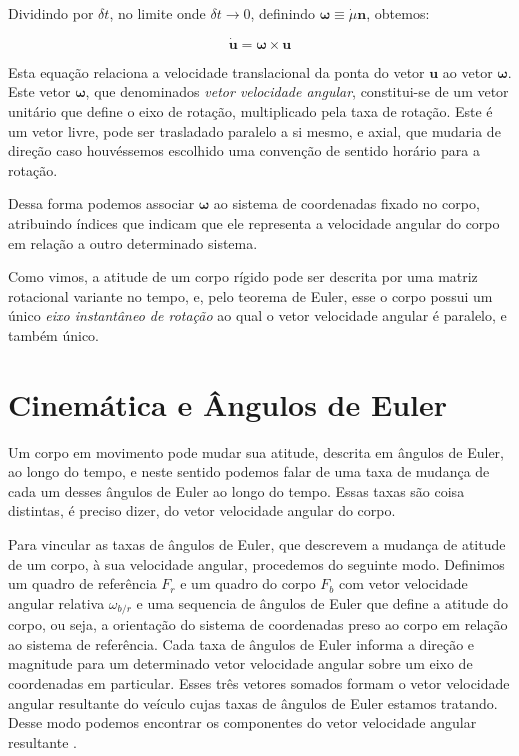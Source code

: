 Dividindo por \(\delta t\), no limite onde \(\delta t \rightarrow 0\), definindo \(\mathbf{\omega} \equiv \dot{\mu}\mathbf{n}\), obtemos:

\begin{equation*}
    \dot{\mathbf{u}} = \mathbf{\omega}\!\times\!\mathbf{u}\tag{1.4-1}
\end{equation*}

Esta equação relaciona a velocidade translacional da ponta do vetor \(\mathbf{u}\) ao vetor \(\mathbf{\omega}\). Este vetor \(\mathbf{\omega}\), que denominados \textit{vetor velocidade angular}, constitui-se de um vetor unitário  que define o eixo de rotação, multiplicado pela taxa de rotação. Este é um vetor livre, pode ser trasladado paralelo a si mesmo, e axial, que mudaria de direção caso houvéssemos escolhido uma convenção de sentido horário para a rotação.

Dessa forma podemos associar \(\mathbf{\omega}\) ao sistema de coordenadas fixado no corpo, atribuindo índices que indicam que ele representa a velocidade angular do corpo em relação a outro determinado sistema.

Como vimos, a atitude de um corpo rígido pode ser descrita por uma matriz rotacional variante no tempo, e, pelo teorema de Euler\footnotemark{}, esse o corpo possui um único \emph{eixo instantâneo de rotação} ao qual o vetor velocidade angular é paralelo, e também único.


\section{Cinemática e Ângulos de Euler}

Um corpo em movimento pode mudar sua atitude, descrita em ângulos de Euler, ao longo do tempo, e neste sentido podemos falar de uma taxa de mudança de cada um desses ângulos de Euler ao longo do tempo. Essas taxas são coisa distintas, é preciso dizer, do vetor velocidade angular do corpo.

Para vincular as taxas de ângulos de Euler, que descrevem a mudança de atitude de um corpo, à sua velocidade angular, procedemos do seguinte modo. Definimos um quadro de referência \(F_{r}\) e um quadro do corpo \(F_{b}\) com vetor velocidade angular relativa \(\omega_{b/r}\) e uma sequencia de ângulos de Euler que define a atitude do corpo, ou seja, a orientação do sistema de coordenadas preso ao corpo em relação ao sistema de referência. Cada taxa de ângulos de Euler informa a direção e magnitude para um determinado vetor velocidade angular sobre um eixo de coordenadas em particular. Esses três vetores somados formam o vetor velocidade angular resultante do veículo cujas taxas de ângulos de Euler estamos tratando. Desse modo podemos encontrar os componentes do vetor velocidade angular resultante \cite{Stevens2016}.


